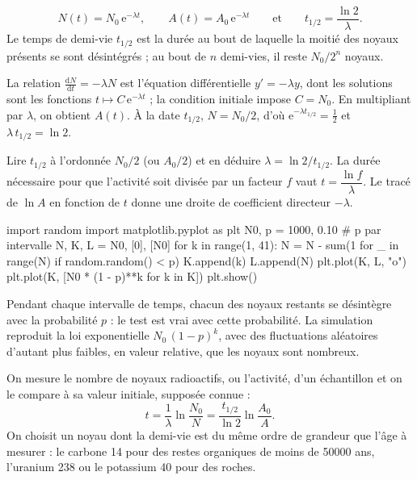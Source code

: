 \begin{theoreme}
\[N(t)=N_0\,\mathrm{e}^{-\lambda t},\qquad A(t)=A_0\,\mathrm{e}^{-\lambda t}\qquad\text{et}\qquad t_{1/2}=\frac{\ln2}{\lambda}.\]
Le temps de demi-vie $t_{1/2}$ est la durée au bout de laquelle la moitié des noyaux présents se sont désintégrés ;
au bout de $n$ demi-vies, il reste $N_0/2^n$ noyaux.
\end{theoreme}
\begin{demonstration}
La relation $\frac{\mathrm{d}N}{\mathrm{d}t}=-\lambda N$ est l'équation différentielle $y'=-\lambda y$, dont les solutions
sont les fonctions $t\mapsto C\,\mathrm{e}^{-\lambda t}$ ; la condition initiale impose $C=N_0$. En multipliant par
$\lambda$, on obtient $A(t)$. À la date $t_{1/2}$, $N=N_0/2$, d'où $\mathrm{e}^{-\lambda t_{1/2}}=\frac12$ et $\lambda\,t_{1/2}=\ln2$.
\end{demonstration}
\begin{savoirfaire}
Lire $t_{1/2}$ à l'ordonnée $N_0/2$ (ou $A_0/2$) et en déduire $\lambda=\ln2/t_{1/2}$. La durée nécessaire pour que
l'activité soit divisée par un facteur $f$ vaut $t=\dfrac{\ln f}{\lambda}$. Le tracé de $\ln A$ en fonction de $t$ donne
une droite de coefficient directeur $-\lambda$.
\end{savoirfaire}
\begin{codecote}[0.58]
\begin{pythoncol}
import random
import matplotlib.pyplot as plt
N0, p = 1000, 0.10   # p par intervalle
N, K, L = N0, [0], [N0]
for k in range(1, 41):
    N = N - sum(1 for _ in range(N)
                if random.random() < p)
    K.append(k)
    L.append(N)
plt.plot(K, L, "o")
plt.plot(K, [N0 * (1 - p)**k for k in K])
plt.show()
\end{pythoncol}
\cote
\fontsize{9.5}{12.5}\selectfont
{}\par\smallskip
Pendant chaque intervalle de temps, chacun des noyaux restants se désintègre avec la probabilité $p$ : le test
 est vrai avec cette probabilité. La simulation reproduit la loi exponentielle
$N_0\,(1-p)^k$, avec des fluctuations aléatoires d'autant plus faibles, en valeur relative, que les noyaux sont nombreux.
\end{codecote}
\begin{propriete}
On mesure le nombre de noyaux radioactifs, ou l'activité, d'un échantillon et on le compare à sa valeur initiale,
supposée connue : \[t=\frac{1}{\lambda}\ln\frac{N_0}{N}=\frac{t_{1/2}}{\ln2}\ln\frac{A_0}{A}.\]
On choisit un noyau dont la demi-vie est du même ordre de grandeur que l'âge à mesurer : le carbone 14 pour des
restes organiques de moins de \num{50000} ans, l'uranium 238 ou le potassium 40 pour des roches.
\end{propriete}

